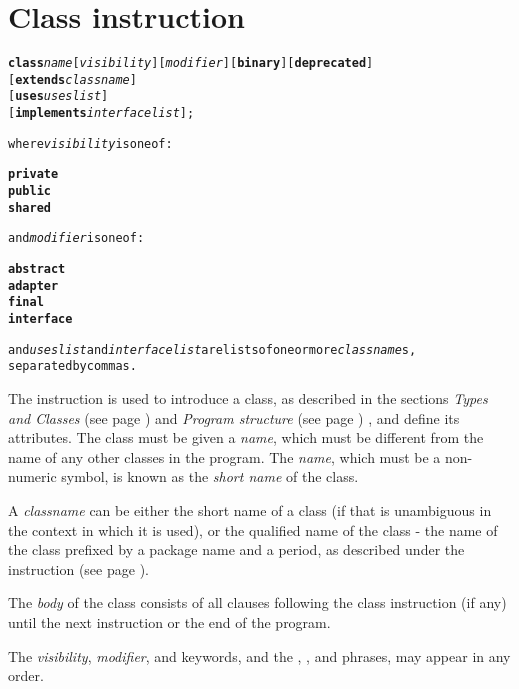 \section{Class instruction}\label{refclass}
\index{,}
\index{,}
\begin{shaded}
\begin{alltt}
\textbf{class} \emph{name} [\emph{visibility}] [\emph{modifier}] [\textbf{binary}] [\textbf{deprecated}]
               [\textbf{extends} \emph{classname}]
               [\textbf{uses} \emph{useslist}]
               [\textbf{implements} \emph{interfacelist}];

where \emph{visibility} is one of:

    \textbf{private}
    \textbf{public}
    \textbf{shared}

and \emph{modifier} is one of:

    \textbf{abstract}
    \textbf{adapter}
    \textbf{final}
    \textbf{interface}

and \emph{useslist} and \emph{interfacelist} are lists of one or more \emph{classname}s,\\ separated by commas.\end{alltt}
\end{shaded}
 The  instruction is used to introduce a class, as
described in the sections \emph{Types and Classes} (see page
  \pageref{reftypes}) and \emph{Program structure} (see page \pageref{refpstruct}) ,
and define its attributes.
The class must be given a \emph{name}, which must be different from
the name of any other classes in the program.
The \emph{name}, which must be a non-numeric symbol, is known as the
\emph{short name} of the class.
 
A \emph{classname} can be either the short name of a class (if that is
unambiguous in the context in which it is used), or the qualified name
of the class - the name of the class prefixed by a package name and
a period, as described under the   instruction (see page \pageref{refpackage}).
 
The \emph{body} of the class consists of all clauses following the
class instruction (if any) until the next  instruction or
the end of the program.
 
The \emph{visibility}, \emph{modifier}, and 
keywords, and the , , and
 phrases, may appear in any order.
